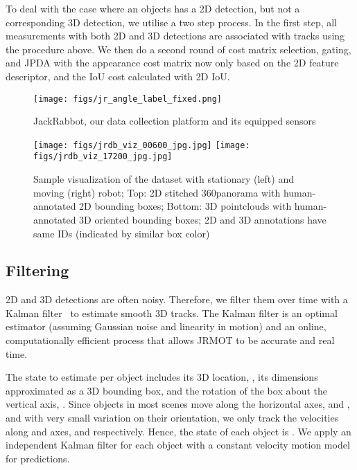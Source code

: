 \documentclass[letterpaper, 10 pt, conference]{ieeeconf}
\newcommand{\jackrabbot}{JackRabbot\xspace}
\newcommand{\methodname}{{JRMOT}\xspace}
\begin{document}
To deal with the case where an objects has a 2D detection, but not a corresponding 3D detection, we utilise a two step process. In the first step, all measurements with both 2D and 3D detections are associated with tracks using the procedure above. We then do a second round of cost matrix selection, gating, and JPDA with the appearance cost matrix now only based on the 2D feature descriptor, and the IoU cost calculated with 2D IoU.


\begin{figure*}[th!]
\centering
\begin{subfigure}[b]{0.27\textwidth}
\texttt{[image: figs/jr\_angle\_label\_fixed.png]}
\caption{\jackrabbot, our data collection platform and its equipped sensors}
\label{fig:JR}
\end{subfigure}
\hfill
\centering
\begin{subfigure}[b]{0.72\textwidth}
\centering
\texttt{[image: figs/jrdb\_viz\_00600\_jpg.jpg]}
\texttt{[image: figs/jrdb\_viz\_17200\_jpg.jpg]}
\caption{Sample visualization of the dataset with stationary (left) and moving (right) robot; Top: 2D stitched 360\degree panorama with human-annotated 2D bounding boxes; Bottom: 3D pointclouds with human-annotated 3D oriented bounding boxes; 2D and 3D annotations have same IDs (indicated by similar box color)}
\label{fig:visualization}
\end{subfigure}
\vspace{-10pt}
\end{figure*}

\subsection{Filtering}
\label{ss:filtering}

2D and 3D detections are often noisy. Therefore, we filter them over time with a Kalman filter~\cite{kalman1960new} to estimate smooth 3D tracks. The Kalman filter is an optimal estimator (assuming Gaussian noise and linearity in motion) and an online, computationally efficient process that allows \methodname to be accurate and real time.

The state to estimate per object includes its 3D location, , its dimensions approximated as a 3D bounding box,  and the rotation of the box about the vertical axis, . Since objects in most scenes move along the horizontal axes,  and , and with very small variation on their orientation, we only track the velocities along  and  axes,  and  respectively. Hence, the state of each object  is . We apply an independent Kalman filter for each object with a constant velocity motion model for predictions.
\end{document}
